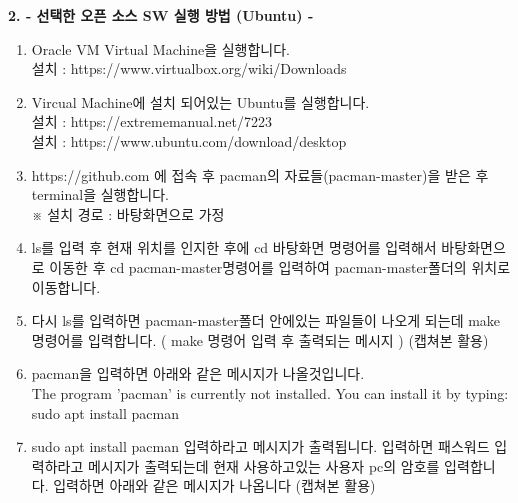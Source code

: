 \documentclass{article}
\begin{document}
\newpage
\begin{large}\textbf{2. - 선택한 오픈 소스 SW 실행 방법 (Ubuntu) -}\end{large}
\begin{enumerate}
\item Oracle VM Virtual Machine을 실행합니다. \\
설치 : https://www.virtualbox.org/wiki/Downloads\\ 
 

\item Vircual Machine에 설치 되어있는 Ubuntu를 실행합니다. \\
설치 : https://extrememanual.net/7223\\
설치 : https://www.ubuntu.com/download/desktop\\

\item https://github.com 에 접속 후 pacman의 자료들(pacman-master)을 받은 후 terminal을 실행합니다. \\※ 설치 경로 : 바탕화면으로 가정\\

\item ls를 입력 후 현재 위치를 인지한 후에 cd 바탕화면 명령어를 입력해서 바탕화면으로 이동한 후 cd pacman-master명령어를 입력하여 pacman-master폴더의 위치로 이동합니다.\\
\item 다시 ls를 입력하면 pacman-master폴더 안에있는 파일들이 나오게 되는데 make 명령어를 입력합니다. ( make 명령어 입력 후 출력되는 메시지 ) (캡쳐본 활용)\\
\item pacman을 입력하면 아래와 같은 메시지가 나올것입니다. \\
The program 'pacman' is currently not installed. You can install it by typing: sudo apt install pacman\\
\item sudo apt install pacman 입력하라고 메시지가 출력됩니다. 입력하면 패스워드 입력하라고 메시지가 출력되는데 현재 사용하고있는 사용자 pc의 암호를 입력합니다. 입력하면 아래와 같은 메시지가 나옵니다 (캡쳐본 활용)
\end{enumerate}
\end{document}
